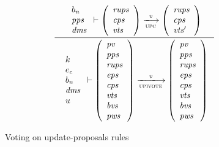 \begin{figure}[htb]
  \begin{equation}
    \label{eq:rule:upi-vote}
    \inference
    {
      {
        \begin{array}{l}
          b_n\\
          \var{pps}\\
          \var{dms}
        \end{array}
      }
      \vdash
      {
        \left(
          \begin{array}{l}
            \var{rups}\\
            \var{cps}\\
            \var{vts}
          \end{array}
        \right)
      }
      \trans{upc}{\var{v}}
      {
        \left(
          \begin{array}{l}
            \var{rups}\\
            \var{cps}\\
            \var{vts'}
          \end{array}
        \right)
      }
    }
    {
      {
        \begin{array}{l}
          k\\
          e_c\\
          b_n\\
          \var{dms}\\
          u
        \end{array}
      }
      \vdash
      {
        \left(
          \begin{array}{l}
            \var{pv}\\
            \var{pps}\\
            \var{rups}\\
            \var{eps}\\
            \var{cps}\\
            \var{vts}\\
            \var{bvs}\\
            \var{pws}
          \end{array}
        \right)
      }
      \trans{upivote}{\var{v}}
      {
        \left(
          \begin{array}{l}
            \var{pv}\\
            \var{pps}\\
            \var{rups}\\
            \var{eps}\\
            \var{cps}\\
            \var{vts}\\
            \var{bvs}\\
            \var{pws}
          \end{array}
        \right)
      }
    }
  \end{equation}
  \caption{Voting on update-proposals rules}
  \label{fig:rules:upi-vote}
\end{figure}

